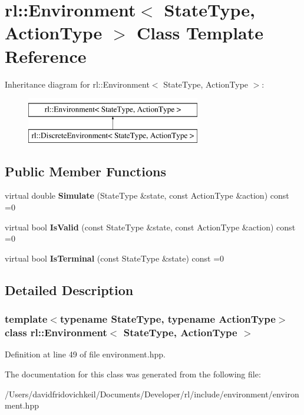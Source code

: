\hypertarget{classrl_1_1_environment}{}\section{rl\+:\+:Environment$<$ State\+Type, Action\+Type $>$ Class Template Reference}
\label{classrl_1_1_environment}
Inheritance diagram for rl\+:\+:Environment$<$ State\+Type, Action\+Type $>$\+:\begin{figure}[H]
\begin{center}
\leavevmode
\includegraphics[height=2.000000cm]{classrl_1_1_environment}
\end{center}
\end{figure}
\subsection*{Public Member Functions}
\begin{DoxyCompactItemize}
\item 
\hypertarget{classrl_1_1_environment_ad97a592b7af8bb74859ebc82192feffe}{}\label{classrl_1_1_environment_ad97a592b7af8bb74859ebc82192feffe} 
virtual double {\bfseries Simulate} (State\+Type \&state, const Action\+Type \&action) const =0
\item 
\hypertarget{classrl_1_1_environment_ad10d85fc78ba844d5c380edd2dbeddec}{}\label{classrl_1_1_environment_ad10d85fc78ba844d5c380edd2dbeddec} 
virtual bool {\bfseries Is\+Valid} (const State\+Type \&state, const Action\+Type \&action) const =0
\item 
\hypertarget{classrl_1_1_environment_a592fbdd73b9b4145a4460e101949698c}{}\label{classrl_1_1_environment_a592fbdd73b9b4145a4460e101949698c} 
virtual bool {\bfseries Is\+Terminal} (const State\+Type \&state) const =0
\end{DoxyCompactItemize}


\subsection{Detailed Description}
\subsubsection*{template$<$typename State\+Type, typename Action\+Type$>$\newline
class rl\+::\+Environment$<$ State\+Type, Action\+Type $>$}



Definition at line 49 of file environment.\+hpp.



The documentation for this class was generated from the following file\+:\begin{DoxyCompactItemize}
\item 
/\+Users/davidfridovichkeil/\+Documents/\+Developer/rl/include/environment/environment.\+hpp\end{DoxyCompactItemize}
